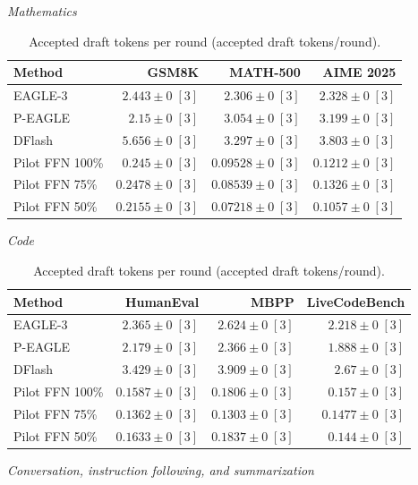 \documentclass[conference,onecolumn]{IEEEtran}
\begin{document}
\begin{table}[!htp]
\centering\small
\setlength{\tabcolsep}{3pt}
\caption{Accepted draft tokens per round (accepted draft tokens/round).}
\label{tab:appendix-metric-accepted-round-none}
\textit{Mathematics}\par\smallskip
\begin{tabular}{@{}>{\raggedright\arraybackslash}p{3.7cm}rrr@{}}
\toprule
Method & GSM8K & MATH-500 & AIME 2025 \\
\midrule
EAGLE-3 & \(2.443 \pm 0\;[3]\) & \(2.306 \pm 0\;[3]\) & \(2.328 \pm 0\;[3]\) \\
P-EAGLE & \(2.15 \pm 0\;[3]\) & \(3.054 \pm 0\;[3]\) & \(3.199 \pm 0\;[3]\) \\
DFlash & \(\mathbf{5.656} \pm 0\;[3]\) & \(\mathbf{3.297} \pm 0\;[3]\) & \(\mathbf{3.803} \pm 0\;[3]\) \\
Pilot FFN 100\% & \(0.245 \pm 0\;[3]\) & \(0.09528 \pm 0\;[3]\) & \(0.1212 \pm 0\;[3]\) \\
Pilot FFN 75\% & \(0.2478 \pm 0\;[3]\) & \(0.08539 \pm 0\;[3]\) & \(0.1326 \pm 0\;[3]\) \\
Pilot FFN 50\% & \(0.2155 \pm 0\;[3]\) & \(0.07218 \pm 0\;[3]\) & \(0.1057 \pm 0\;[3]\) \\
\bottomrule
\end{tabular}\par\medskip
\textit{Code}\par\smallskip
\begin{tabular}{@{}>{\raggedright\arraybackslash}p{3.7cm}rrr@{}}
\toprule
Method & HumanEval & MBPP & LiveCodeBench \\
\midrule
EAGLE-3 & \(2.365 \pm 0\;[3]\) & \(2.624 \pm 0\;[3]\) & \(2.218 \pm 0\;[3]\) \\
P-EAGLE & \(2.179 \pm 0\;[3]\) & \(2.366 \pm 0\;[3]\) & \(1.888 \pm 0\;[3]\) \\
DFlash & \(\mathbf{3.429} \pm 0\;[3]\) & \(\mathbf{3.909} \pm 0\;[3]\) & \(\mathbf{2.67} \pm 0\;[3]\) \\
Pilot FFN 100\% & \(0.1587 \pm 0\;[3]\) & \(0.1806 \pm 0\;[3]\) & \(0.157 \pm 0\;[3]\) \\
Pilot FFN 75\% & \(0.1362 \pm 0\;[3]\) & \(0.1303 \pm 0\;[3]\) & \(0.1477 \pm 0\;[3]\) \\
Pilot FFN 50\% & \(0.1633 \pm 0\;[3]\) & \(0.1837 \pm 0\;[3]\) & \(0.144 \pm 0\;[3]\) \\
\bottomrule
\end{tabular}\par\medskip
\textit{Conversation, instruction following, and summarization}\par\smallskip

\end{table}
\end{document}
